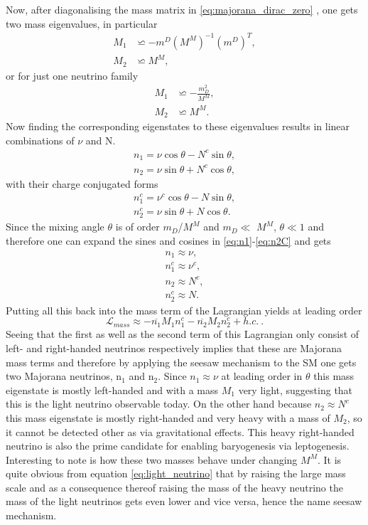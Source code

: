 Now, after diagonalising the mass matrix in \eqref{eq:majorana_dirac_zero} \cite[pp. 2-3]{Lindner:2001hr}, one gets two mass eigenvalues, in particular
\begin{align*}
	M_1&\backsimeq-m^D{\left(M^M\right)}^{-1}{\left(m^D\right)}^{T},\\
	M_2&\backsimeq M^M,
\end{align*}
or for just one neutrino family
\begin{align}
	M_1&\backsimeq -\frac{m_D^2}{M^M},
	\label{eq:light_neutrino}
	\\
	M_2&\backsimeq M^M.
	\label{eq:heavy_neutrino}
\end{align}
Now finding the corresponding eigenstates to these eigenvalues results in linear combinations of $\nu$ and N.
\begin{align}
	n_{1}=\nu\cos\theta-N^c\sin\theta,
	\label{eq:n1}
	\\
	n_{2}=\nu\sin\theta+N^c\cos\theta,
	\label{eq:n2}
\end{align}
with their charge conjugated forms
\begin{align}
n_{1}^c=\nu^c\cos\theta-N\sin\theta,
\label{eq:n1C}
\\
n_{2}^c=\nu\sin\theta+N\cos\theta.
\label{eq:n2C}
\end{align}
Since the mixing angle $\theta$ is of order $m_D$/$M^M$ and $m_D\ll$ $M^M$, $\theta\ll1$ and therefore one can expand the sines and cosines in \eqref{eq:n1}-\eqref{eq:n2C} and gets
\begin{align}
	n_{1}\approx\nu,\\
	n_{1}^c\approx\nu^c,\\
	n_{2}\approx N^c,\\
	n_{2}^c\approx N.
\end{align}
Putting all this back into the mass term of the Lagrangian yields at leading order
\begin{equation}
	\mathcal{L}_{mass}\approx-\overline{n_1}M_1n_1^c-\overline{n_2}M_2n_2^c+h.c.\:.
\end{equation}
Seeing that the first as well as the second term of this Lagrangian only consist of left- and right-handed neutrinos respectively implies that these are Majorana mass terms and therefore by applying the seesaw mechanism to the SM one gets two Majorana neutrinos, n$_1$ and n$_2$. \newline\indent
Since $n_{1}\approx\nu$ at leading order in $\theta$ this mass eigenstate is mostly left-handed and with a mass $M_1$ very light, suggesting that this is the light neutrino observable today.\newline\indent
On the other hand because $n_{2}\approx N^c$ this mass eigenstate is mostly right-handed and very heavy with a mass of $M_2$, so it cannot be detected other as via gravitational effects. This heavy right-handed neutrino is also the prime candidate for enabling baryogenesis via leptogenesis. \newline\indent
Interesting to note is how these two masses behave under changing $M^M$. It is quite obvious from equation \eqref{eq:light_neutrino} that by raising the large mass scale and as a consequence thereof raising the mass of the heavy neutrino the mass of the light neutrinos gets even lower and vice versa, hence the name seesaw mechanism. 
